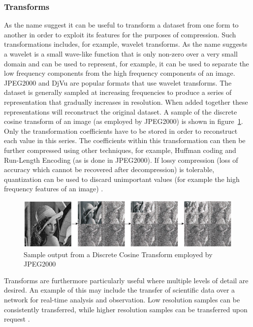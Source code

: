\subsubsection{Transforms}
As the name suggest it can be useful to transform a dataset from one form to another in order to exploit its features for the purposes of compression. Such transformations 
includes, for example, wavelet transforms. As the name suggests a wavelet is a small wave-like function that is only non-zero over a very small domain and can be used 
to represent, for example, it can be used to separate the low frequency components from the high frequency components of an image. JPEG2000 and DjVu are popular formats that use 
wavelet transforms. The dataset is generally sampled at increasing frequencies to produce a series of representation that gradually increases in resolution. When added together 
these representations will reconstruct the original dataset. A sample of the discrete cosine transform of an image (as employed by JPEG2000) is shown in figure~\ref{TRANSFORM_SAMPLE}. 
Only the transformation coefficients have to be stored in order to reconstruct each value in this series. The coefficients within this transformation can then be further compressed 
using other techniques, for example, Huffman coding and Run-Length Encoding (as is done in JPEG2000). If lossy compression (loss of accuracy which cannot be recovered after 
decompression) is tolerable, quantization can be used to discard unimportant values (for example the high frequency features of an image) \cite{952804}\cite[ch. 5]{salomon2004data}.
\begin{figure}[h!]
 \centering
 \includegraphics[width=1.0\textwidth]{DCTSample.png}
 \caption{Sample output from a Discrete Cosine Transform employed by JPEG2000 \cite{952804}}
 \label{TRANSFORM_SAMPLE}
\end{figure}

Transforms are furthermore particularly useful where multiple levels of detail are desired. An example of this may include the transfer of scientific data over a network 
for real-time analysis and observation. Low resolution samples can be consistently transferred, while higher resolution samples can be transferred upon request \cite{Tao:1994:PTS:951087.951108}.

